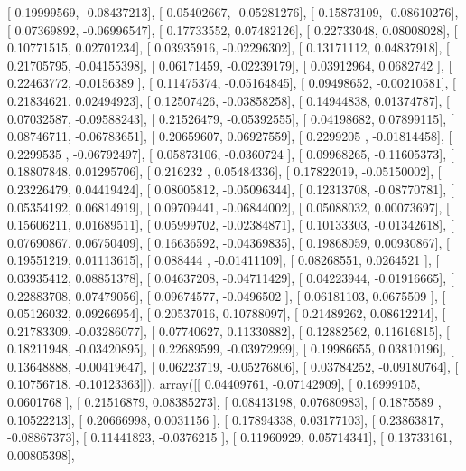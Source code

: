 \documentclass{article}
\begin{document}
       [ 0.19999569, -0.08437213],
       [ 0.05402667, -0.05281276],
       [ 0.15873109, -0.08610276],
       [ 0.07369892, -0.06996547],
       [ 0.17733552,  0.07482126],
       [ 0.22733048,  0.08008028],
       [ 0.10771515,  0.02701234],
       [ 0.03935916, -0.02296302],
       [ 0.13171112,  0.04837918],
       [ 0.21705795, -0.04155398],
       [ 0.06171459, -0.02239179],
       [ 0.03912964,  0.0682742 ],
       [ 0.22463772, -0.0156389 ],
       [ 0.11475374, -0.05164845],
       [ 0.09498652, -0.00210581],
       [ 0.21834621,  0.02494923],
       [ 0.12507426, -0.03858258],
       [ 0.14944838,  0.01374787],
       [ 0.07032587, -0.09588243],
       [ 0.21526479, -0.05392555],
       [ 0.04198682,  0.07899115],
       [ 0.08746711, -0.06783651],
       [ 0.20659607,  0.06927559],
       [ 0.2299205 , -0.01814458],
       [ 0.2299535 , -0.06792497],
       [ 0.05873106, -0.0360724 ],
       [ 0.09968265, -0.11605373],
       [ 0.18807848,  0.01295706],
       [ 0.216232  ,  0.05484336],
       [ 0.17822019, -0.05150002],
       [ 0.23226479,  0.04419424],
       [ 0.08005812, -0.05096344],
       [ 0.12313708, -0.08770781],
       [ 0.05354192,  0.06814919],
       [ 0.09709441, -0.06844002],
       [ 0.05088032,  0.00073697],
       [ 0.15606211,  0.01689511],
       [ 0.05999702, -0.02384871],
       [ 0.10133303, -0.01342618],
       [ 0.07690867,  0.06750409],
       [ 0.16636592, -0.04369835],
       [ 0.19868059,  0.00930867],
       [ 0.19551219,  0.01113615],
       [ 0.088444  , -0.01411109],
       [ 0.08268551,  0.0264521 ],
       [ 0.03935412,  0.08851378],
       [ 0.04637208, -0.04711429],
       [ 0.04223944, -0.01916665],
       [ 0.22883708,  0.07479056],
       [ 0.09674577, -0.0496502 ],
       [ 0.06181103,  0.0675509 ],
       [ 0.05126032,  0.09266954],
       [ 0.20537016,  0.10788097],
       [ 0.21489262,  0.08612214],
       [ 0.21783309, -0.03286077],
       [ 0.07740627,  0.11330882],
       [ 0.12882562,  0.11616815],
       [ 0.18211948, -0.03420895],
       [ 0.22689599, -0.03972999],
       [ 0.19986655,  0.03810196],
       [ 0.13648888, -0.00419647],
       [ 0.06223719, -0.05276806],
       [ 0.03784252, -0.09180764],
       [ 0.10756718, -0.10123363]]), array([[ 0.04409761, -0.07142909],
       [ 0.16999105,  0.0601768 ],
       [ 0.21516879,  0.08385273],
       [ 0.08413198,  0.07680983],
       [ 0.1875589 ,  0.10522213],
       [ 0.20666998,  0.0031156 ],
       [ 0.17894338,  0.03177103],
       [ 0.23863817, -0.08867373],
       [ 0.11441823, -0.0376215 ],
       [ 0.11960929,  0.05714341],
       [ 0.13733161,  0.00805398],
\end{document}
